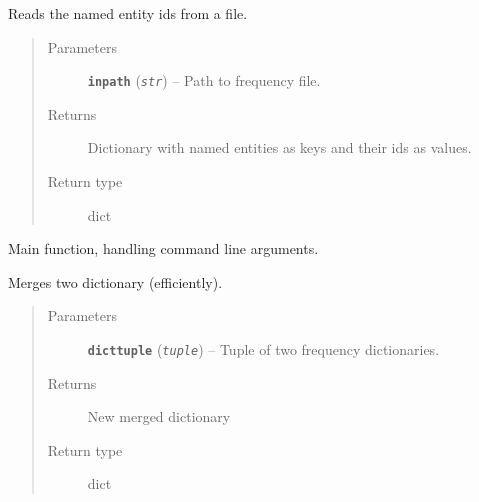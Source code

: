 \documentclass[letterpaper,10pt,english]{sphinxmanual}
\begin{document}

\begin{fulllineitems}
\label{src.prep.nes:src.prep.nes.merge.id_worker}
Reads the named entity ids from a file.
\begin{quote}\begin{description}
\item[{Parameters}] \leavevmode
\textbf{\texttt{inpath}} (\emph{\texttt{str}}) -- Path to frequency file.

\item[{Returns}] \leavevmode
Dictionary with named entities as keys and their ids as values.

\item[{Return type}] \leavevmode
dict

\end{description}\end{quote}

\end{fulllineitems}


\begin{fulllineitems}
\label{src.prep.nes:src.prep.nes.merge.main}
Main function, handling command line arguments.

\end{fulllineitems}


\begin{fulllineitems}
\label{src.prep.nes:src.prep.nes.merge.merge_dicts}
Merges two dictionary (efficiently).
\begin{quote}\begin{description}
\item[{Parameters}] \leavevmode
\textbf{\texttt{dicttuple}} (\emph{\texttt{tuple}}) -- Tuple of two frequency dictionaries.

\item[{Returns}] \leavevmode
New merged dictionary

\item[{Return type}] \leavevmode
dict

\end{description}\end{quote}

\end{fulllineitems}
\end{document}
